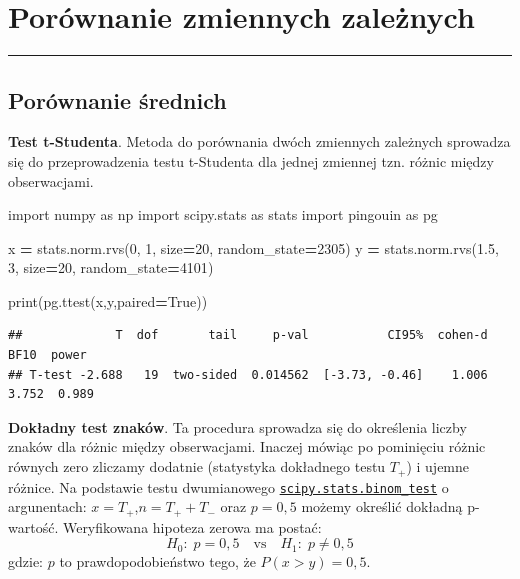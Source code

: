 \documentclass[polish,]{book}
\newenvironment{Shaded}{\begin{snugshade}}{\end{snugshade}}
\newcommand{\BuiltInTok}[1]{#1}
\newcommand{\DecValTok}[1]{\textcolor[rgb]{0.00,0.00,0.81}{#1}}
\newcommand{\FloatTok}[1]{\textcolor[rgb]{0.00,0.00,0.81}{#1}}
\newcommand{\ImportTok}[1]{#1}
\newcommand{\NormalTok}[1]{#1}
\newcommand{\OperatorTok}[1]{\textcolor[rgb]{0.81,0.36,0.00}{\textbf{#1}}}
\newcommand{\VariableTok}[1]{\textcolor[rgb]{0.00,0.00,0.00}{#1}}
\begin{document}
\hypertarget{R9}{%
\chapter{Porównanie zmiennych zależnych}\label{R9}}

\begin{center}\rule{0.5\linewidth}{\linethickness}\end{center}

\hypertarget{R91}{%
\section{Porównanie średnich}\label{R91}}

\textbf{Test t-Studenta}. Metoda do porównania dwóch zmiennych zależnych sprowadza się do przeprowadzenia testu t-Studenta dla jednej zmiennej tzn. różnic między obserwacjami.

\begin{Shaded}
\begin{Highlighting}[]
\ImportTok{import}\NormalTok{ numpy }\ImportTok{as}\NormalTok{ np}
\ImportTok{import}\NormalTok{ scipy.stats }\ImportTok{as}\NormalTok{ stats}
\ImportTok{import}\NormalTok{ pingouin }\ImportTok{as}\NormalTok{ pg}
  
\NormalTok{x }\OperatorTok{=}\NormalTok{ stats.norm.rvs(}\DecValTok{0}\NormalTok{, }\DecValTok{1}\NormalTok{, size}\OperatorTok{=}\DecValTok{20}\NormalTok{, random_state}\OperatorTok{=}\DecValTok{2305}\NormalTok{)}
\NormalTok{y }\OperatorTok{=}\NormalTok{ stats.norm.rvs(}\FloatTok{1.5}\NormalTok{, }\DecValTok{3}\NormalTok{, size}\OperatorTok{=}\DecValTok{20}\NormalTok{, random_state}\OperatorTok{=}\DecValTok{4101}\NormalTok{)}
  
\BuiltInTok{print}\NormalTok{(pg.ttest(x,y,paired}\OperatorTok{=}\VariableTok{True}\NormalTok{))}
\end{Highlighting}
\end{Shaded}

\begin{verbatim}
##             T  dof       tail     p-val           CI95%  cohen-d   BF10  power
## T-test -2.688   19  two-sided  0.014562  [-3.73, -0.46]    1.006  3.752  0.989
\end{verbatim}

\textbf{Dokładny test znaków}. Ta procedura sprowadza się do określenia liczby znaków dla różnic między obserwacjami. Inaczej mówiąc po pominięciu różnic równych zero zliczamy dodatnie (statystyka dokładnego testu \(T_+\)) i ujemne różnice. Na podstawie testu dwumianowego \href{https://docs.scipy.org/doc/scipy/reference/generated/scipy.stats.binom_test.html\#scipy.stats.binom_test}{\texttt{scipy.stats.binom\_test}} o argunentach: \(x=T_+\),\(n=T_++T_-\) oraz \(p=0,5\) możemy określić dokładną p-wartość. Weryfikowana hipoteza zerowa ma postać:
\begin{equation}
H_0:\;p=0,5\quad\mbox{vs}\quad H_1:\;p\neq 0,5
\label{eq:dep01}
\end{equation}
gdzie: \(p\) to prawdopodobieństwo tego, że \(P(x>y)=0,5\).
\end{document}

